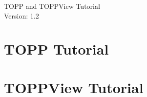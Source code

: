 \documentclass[a4paper]{article}
\begin{document}
\begin{titlepage}
\vspace*{7cm}
\begin{center}
{\Large TOPP and TOPPView Tutorial\\[1ex]\large Version: 1.2 }\\
\end{center}
\end{titlepage}


\setcounter{tocdepth}{2}
\tableofcontents
\pagebreak

\section{TOPP Tutorial}
	
	
	\pagebreak
	
	\pagebreak
	
	\pagebreak
	
	\pagebreak
	
	\pagebreak
	
	\pagebreak
	
	\pagebreak
	
	\pagebreak
	
	\pagebreak
	

\section{TOPPView Tutorial}
	
	
	\pagebreak
	
	\pagebreak
	
	\pagebreak
	
	\pagebreak
	
\end{document}
